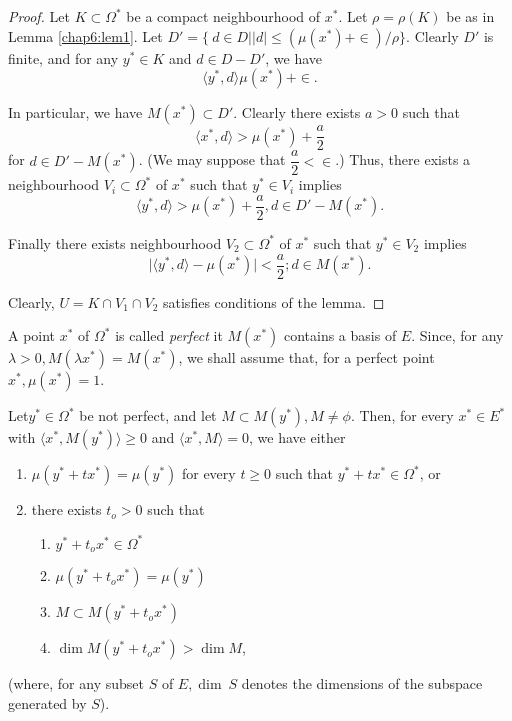\begin{proof}
  Let $K \subset \Omega^*$ be a compact neighbourhood of $x^*$. Let
  $\rho = \rho (K)$ be as in Lemma \ref{chap6:lem1}. Let $D' = \bigg\{\ d \in D
  \big| |d| \leq (\mu (x^*) + \in) / \rho \bigg\}$. Clearly $D'$ is
  finite, and for any $y^* \in K$ and $d \in D - D'$, we have  
  $$
  \langle y^*, d\rangle  \mu (x^*) + \in .
  $$
  
  In particular, we have $M(x^*) \subset D'$. Clearly there exists $a
  > 0$ such that  
  $$
  \langle x^*, d \rangle > \mu (x^*) + \frac{a}{2}
  $$
  for $d \in D'- M(x^*)$. (We may suppose that $\dfrac{a}{2} < \in $.)
  Thus, there exists a neighbourhood $V_i \subset \Omega ^*$ of $x^*$
  such that $y^* \in V_i$ implies  
  $$
  \langle y^* , d \rangle > \mu (x^* )+ \frac{a}{2} , d \in D' - M(x^*).
  $$

  Finally there exists  neighbourhood $V_2 \subset \Omega^*$ of $x^*$
  such that $y^* \in V_2$ implies 
  $$
  | \langle y^* , d \rangle - \mu (x^*) \big| < \frac{a}{2}; d \in M (x^*). 
  $$
  
  Clearly, $U = K \cap V_1 \cap V_2$ satisfies conditions of the lemma. 
\end{proof}

A point $x^*$ of $\Omega^*$ is called \textit{perfect} it $M(x^*)$
contains a basis of $E$. Since, for any $\lambda > 0, M( \lambda x^* ) =
M(x^*)$, we shall assume that, for a perfect point $x^*, \mu (x^*) =
1$.
 
\begin{lem}\label{chap6:lem3} %
  Let\pageoriginale $y^* \in \Omega^* $ be not perfect, and let $M
  \subset M (y^*) , M 
  \neq \phi$. Then, for every $x^* \in E^*$ with $\langle x^* , M(y^*)
  \rangle \geq 0$ and $\langle x^*,  M \rangle = 0$, we have either  
  \begin{enumerate} [\rm (i)]
  \item $\mu (y^* + tx^*) = \mu (y^*)$ for every $t \geq 0$ such that
    $y^*+ t x^* \in \Omega^*$, or 
  \item there exists $t_o > 0 $ such that 
    \begin{enumerate}[\rm (a)]
    \item $y^* + t_o x^* \in \Omega^*$
    \item $\mu (y^* + t_o x^*) = \mu(y^*)$
    \item $M \subset M (y^* + t_o x^*)$ 
    \item $\dim M(y^* + t_o x^*) > \dim M$,
    \end{enumerate} 
  \end{enumerate}
  (where, for any subset $S$ of $E, \dim ~ S$ denotes the dimensions of
  the subspace generated by $S$). 
\end{lem}

